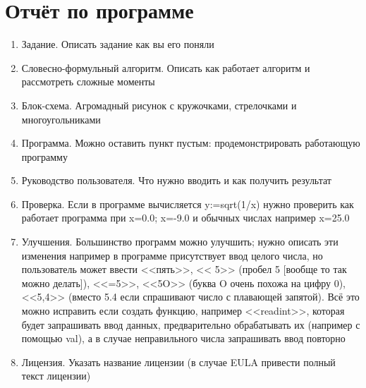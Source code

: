 \documentclass[unicode, 12pt, a4paper,oneside,fleqn]{article}
\begin{document}
\section{Отчёт по программе}
\begin{enumerate}
\item Задание. Описать задание как вы его поняли
\item Словесно-формульный алгоритм. Описать как работает алгоритм и
  рассмотреть сложные моменты
\item Блок-схема. Агромадный рисунок с кружочками, стрелочками и
  многоугольниками
\item Программа. Можно оставить пункт пустым: продемонстрировать
  работающую программу
\item Руководство пользователя. Что нужно вводить и как получить результат
\item Проверка. Если в программе вычисляется y:=sqrt(1/x) нужно
  проверить как работает программа при x=0.0; x=-9.0 и обычных числах например x=25.0
\item Улучшения. Большинство программ можно улучшить; нужно
  описать эти изменения например в программе присутствует ввод целого числа,
  но пользователь может ввести
  <<пять>>,
  << 5>> (пробел 5 [вообще то так можно делать]),
  <<=5>>,
  <<5O>> (буква O очень похожа на цифру 0),
  <<5,4>> (вместо 5.4 если спрашивают число с плавающей запятой).
  Всё это можно исправить если создать функцию, например <<readint>>,
  которая будет запрашивать ввод данных, предварительно обрабатывать
  их (например с помощью val), а в случае неправильного числа
  запрашивать ввод повторно
\item Лицензия. Указать название лицензии (в случае EULA привести
  полный текст лицензии)


\end{enumerate}
\end{document}
